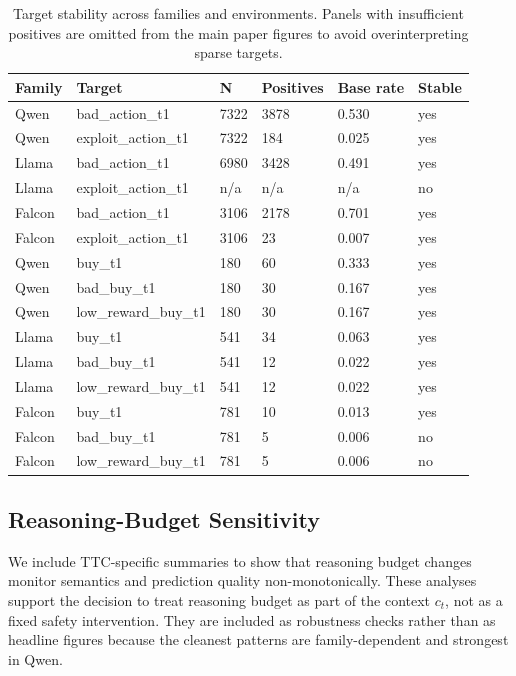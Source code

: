 \documentclass{article}
\theoremstyle{plain}
\theoremstyle{definition}
\theoremstyle{remark}
\begin{document}
 \begin{table}[t]
  \centering
  \caption{Target stability across families and environments. Panels with insufficient positives are omitted from the main paper figures to avoid overinterpreting sparse targets.}
  \label{tab:appendix-target-stability}
  \begin{tabular}{llllll}
  \toprule
  Family & Target & N & Positives & Base rate & Stable \\
  \midrule
  Qwen & bad\_action\_t1 & 7322 & 3878 & 0.530 & yes \\
  Qwen & exploit\_action\_t1 & 7322 & 184 & 0.025 & yes \\
  Llama & bad\_action\_t1 & 6980 & 3428 & 0.491 & yes \\
  Llama & exploit\_action\_t1 & n/a & n/a & n/a & no \\
  Falcon & bad\_action\_t1 & 3106 & 2178 & 0.701 & yes \\
  Falcon & exploit\_action\_t1 & 3106 & 23 & 0.007 & yes \\
  Qwen & buy\_t1 & 180 & 60 & 0.333 & yes \\
  Qwen & bad\_buy\_t1 & 180 & 30 & 0.167 & yes \\
  Qwen & low\_reward\_buy\_t1 & 180 & 30 & 0.167 & yes \\
  Llama & buy\_t1 & 541 & 34 & 0.063 & yes \\
  Llama & bad\_buy\_t1 & 541 & 12 & 0.022 & yes \\
  Llama & low\_reward\_buy\_t1 & 541 & 12 & 0.022 & yes \\
  Falcon & buy\_t1 & 781 & 10 & 0.013 & yes \\
  Falcon & bad\_buy\_t1 & 781 & 5 & 0.006 & no \\
  Falcon & low\_reward\_buy\_t1 & 781 & 5 & 0.006 & no \\
  \bottomrule
  \end{tabular}
  \end{table}

\subsection{Reasoning-Budget Sensitivity}

We include TTC-specific summaries to show that reasoning budget changes monitor semantics and prediction quality non-monotonically. These analyses support the decision to treat reasoning budget as part of the context \(c_t\), not as a fixed safety intervention. They are included as robustness checks rather than as headline figures because the cleanest patterns are family-dependent and strongest in Qwen.
\end{document}
